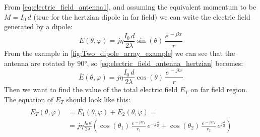 From \cref{eq:electric_field_antenna1}, and assuming the equivalent momentum to be $M=I_0\,d$ (true for the hertzian dipole in far field) we can write the electric field generated by a dipole:
\begin{equation}\label{eq:electric_field_antenna_hertzian}
    \overline{E}(\theta,\varphi)=j\eta\frac{I_0\,d}{2\lambda}\sin(\theta)\,\frac{e^{\,-jkr}}{r}
\end{equation}
From the example in \cref{fig:Two_dipole_array_example} we can see that the antenna are rotated by $90\si{\degree}$, so \cref{eq:electric_field_antenna_hertzian} becomes:
\begin{equation}\label{eq:electric_field_antenna_hertzian_rotated}
    \overline{E}(\theta,\varphi)=j\eta\frac{I_0\,d}{2\lambda}\cos(\theta)\,\frac{e^{\,-jkr}}{r}
\end{equation}
Then we want to find the value of the total electric field $E_T$ on far field region. The equation of $E_T$ should look like this:
\begin{align}
    \begin{split}
    \overline{E_T}(\theta,\varphi)&=\overline{E_1}(\theta,\varphi)+\overline{E_2}(\theta,\varphi)=\\[5pt]
    &=j\eta\frac{I_0\,d}{2\lambda}\left( \cos(\theta_1)\,\frac{e^{\,-jkr_1}}{r_1}\,e^{-j\frac{\delta}{2}}+ \cos(\theta_2)\,\frac{e^{\,-jkr_2}}{r_2}\,e^{j\frac{\delta}{2}} \right)
    \end{split}
\end{align}


